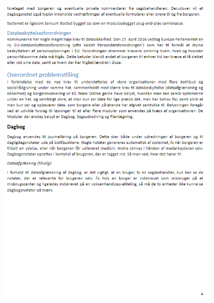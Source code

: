 \begin{figure}[hbt!]
\begin{center}
  \includegraphics[scale = 1]{./PNG/Case/Case_4.png} 
\end{center}
\end{figure}

